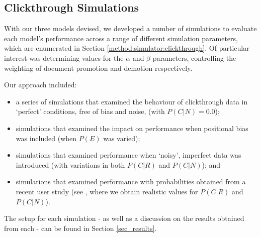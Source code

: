 \subsection{Clickthrough Simulations}\label{method:simulations}
With our three models devised, we developed a number of simulations to evaluate each model's performance across a range of different simulation parameters, which are enumerated in Section \ref{method:simulator:clickthrough}. Of particular interest was determining values for the $\alpha$ and $\beta$ parameters, controlling the weighting of document promotion and demotion respectively.

Our approach included:

\begin{itemize}
	
	\item{a series of simulations that examined the behaviour of clickthrough data in `perfect' conditions, free of bias and noise, (with $P(C|N) = 0.0$);}
	
	\item{simulations that examined the impact on performance when positional bias was included (when $P(E)$ was varied);}
	
	\item{simulations that examined performance when `noisy', imperfect data was introduced (with variations in both $P(C|R)$ and $P(C|N)$); and}
	
	\item{simulations that examined performance with probabilities obtained from a recent user study (see \cite{smucker2012time_based_calibration}, where we obtain realistic values for $P(C|R)$ and $P(C|N)$).}
	
\end{itemize}

The setup for each simulation - as well as a discussion on the results obtained from each - can be found in Section \ref{sec_results}.